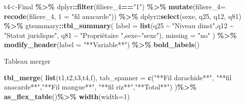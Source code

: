 \documentclass[
]{article}
\newenvironment{Shaded}{\begin{snugshade}}{\end{snugshade}}
\newcommand{\AttributeTok}[1]{\textcolor[rgb]{0.13,0.29,0.53}{#1}}
\newcommand{\DecValTok}[1]{\textcolor[rgb]{0.00,0.00,0.81}{#1}}
\newcommand{\FunctionTok}[1]{\textcolor[rgb]{0.13,0.29,0.53}{\textbf{#1}}}
\newcommand{\NormalTok}[1]{#1}
\newcommand{\OtherTok}[1]{\textcolor[rgb]{0.56,0.35,0.01}{#1}}
\newcommand{\SpecialCharTok}[1]{\textcolor[rgb]{0.81,0.36,0.00}{\textbf{#1}}}
\newcommand{\StringTok}[1]{\textcolor[rgb]{0.31,0.60,0.02}{#1}}
\begin{document}
\begin{Shaded}
\begin{Highlighting}[]
\NormalTok{t4}\OtherTok{\textless{}{-}}\NormalTok{Final }\SpecialCharTok{\%\textgreater{}\%}
\NormalTok{  dplyr}\SpecialCharTok{::}\FunctionTok{filter}\NormalTok{(filiere\_4}\SpecialCharTok{==}\StringTok{"1"}\NormalTok{) }\SpecialCharTok{\%\textgreater{}\%} 
  \FunctionTok{mutate}\NormalTok{(}\AttributeTok{filiere\_4=} \FunctionTok{recode}\NormalTok{(filiere\_4, }\StringTok{\textasciigrave{}}\AttributeTok{1}\StringTok{\textasciigrave{}} \OtherTok{=} \StringTok{"fil anacarde"}\NormalTok{)) }\SpecialCharTok{\%\textgreater{}\%}
\NormalTok{  dplyr}\SpecialCharTok{::}\FunctionTok{select}\NormalTok{(sexe, q25, q12, q81) }\SpecialCharTok{\%\textgreater{}\%}
\NormalTok{  gtsummary}\SpecialCharTok{::}\FunctionTok{tbl\_summary}\NormalTok{(}
      \AttributeTok{label =} \FunctionTok{list}\NormalTok{(q25 }\SpecialCharTok{\textasciitilde{}} \StringTok{"Niveau d\textquotesingle{}inst"}\NormalTok{,q12 }\SpecialCharTok{\textasciitilde{}} \StringTok{"Statut juridique"}\NormalTok{,}
\NormalTok{            q81 }\SpecialCharTok{\textasciitilde{}} \StringTok{"Propriétaire "}\NormalTok{,sexe}\SpecialCharTok{\textasciitilde{}}\StringTok{"sexe"}\NormalTok{),}
          \AttributeTok{missing =} \StringTok{"no"}
\NormalTok{        ) }\SpecialCharTok{\%\textgreater{}\%} \FunctionTok{modify\_header}\NormalTok{(}\AttributeTok{label =} \StringTok{"**Variable**"}\NormalTok{) }\SpecialCharTok{\%\textgreater{}\%} \FunctionTok{bold\_labels}\NormalTok{()}
\end{Highlighting}
\end{Shaded}

Tableau merger

\begin{Shaded}
\begin{Highlighting}[]
\FunctionTok{tbl\_merge}\NormalTok{(}
  \FunctionTok{list}\NormalTok{(t1,t2,t3,t4,f),}
  \AttributeTok{tab\_spanner =} \FunctionTok{c}\NormalTok{(}\StringTok{"**Fil d\textquotesingle{}arachide**"}\NormalTok{,}
                  \StringTok{"**fil anacarde**"}\NormalTok{,}\StringTok{"**Fil mangue**"}\NormalTok{,}
                  \StringTok{"**fil riz**"}\NormalTok{,}\StringTok{"**Total**"}\NormalTok{)}
\NormalTok{                  )}\SpecialCharTok{\%\textgreater{}\%} \FunctionTok{as\_flex\_table}\NormalTok{()}\SpecialCharTok{\%\textgreater{}\%} 
  \FunctionTok{width}\NormalTok{(}\AttributeTok{width=}\DecValTok{1}\NormalTok{)}
\end{Highlighting}
\end{Shaded}
\end{document}
